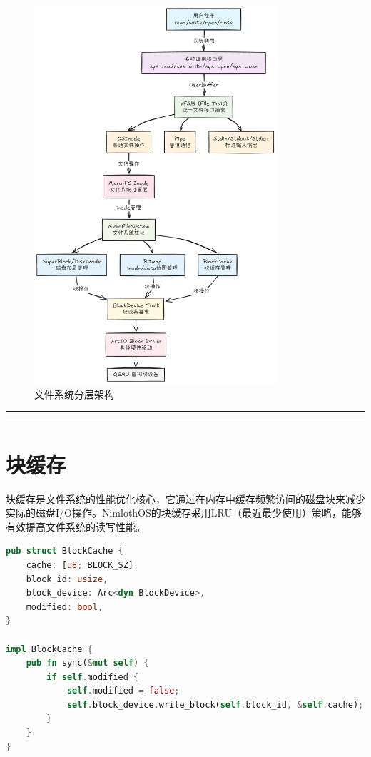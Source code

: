 \begin{figure}[htbp]
    \centering
    \includegraphics[width=0.8\textwidth]{../image/文件系统.png}
    \caption{文件系统分层架构}
    \label{fig:filesystem-arch}
\end{figure}

\clearpage

\noindent
\rule{0.4\textwidth}{0.4pt}
\hfill
{}
\hfill
\rule{0.4\textwidth}{0.4pt}

\section{块缓存}

块缓存是文件系统的性能优化核心，它通过在内存中缓存频繁访问的磁盘块来减少实际的磁盘I/O操作。NimlothOS的块缓存采用LRU（最近最少使用）策略，能够有效提高文件系统的读写性能。

\begin{lstlisting}[language=Rust]
pub struct BlockCache {
    cache: [u8; BLOCK_SZ],
    block_id: usize,
    block_device: Arc<dyn BlockDevice>,
    modified: bool,
}

impl BlockCache {
    pub fn sync(&mut self) {
        if self.modified {
            self.modified = false;
            self.block_device.write_block(self.block_id, &self.cache);
        }
    }
}
\end{lstlisting}

